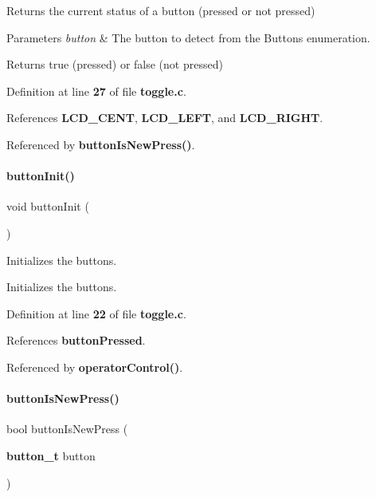 Returns the current status of a button (pressed or not pressed) 


\begin{DoxyParams}{Parameters}
{\em button} & The button to detect from the Buttons enumeration.\\
\hline
\end{DoxyParams}
\begin{DoxyReturn}{Returns}
true (pressed) or false (not pressed) 
\end{DoxyReturn}


Definition at line \textbf{ 27} of file \textbf{ toggle.\+c}.



References \textbf{ L\+C\+D\+\_\+\+C\+E\+NT}, \textbf{ L\+C\+D\+\_\+\+L\+E\+FT}, and \textbf{ L\+C\+D\+\_\+\+R\+I\+G\+HT}.



Referenced by \textbf{ button\+Is\+New\+Press()}.

\mbox{\label{toggle_8h_a2b3d226371575c894979ab84bce95626}} 
\paragraph{button\+Init()}
{\footnotesize\ttfamily void button\+Init (\begin{DoxyParamCaption}{ }\end{DoxyParamCaption})}



Initializes the buttons. 

Initializes the buttons. 

Definition at line \textbf{ 22} of file \textbf{ toggle.\+c}.



References \textbf{ button\+Pressed}.



Referenced by \textbf{ operator\+Control()}.

\mbox{\label{toggle_8h_ae819f86fad1b51d66f4294140b53ff77}} 
\paragraph{button\+Is\+New\+Press()}
{\footnotesize\ttfamily bool button\+Is\+New\+Press (\begin{DoxyParamCaption}\item[{\textbf{ button\+\_\+t}}]{button }\end{DoxyParamCaption})}



